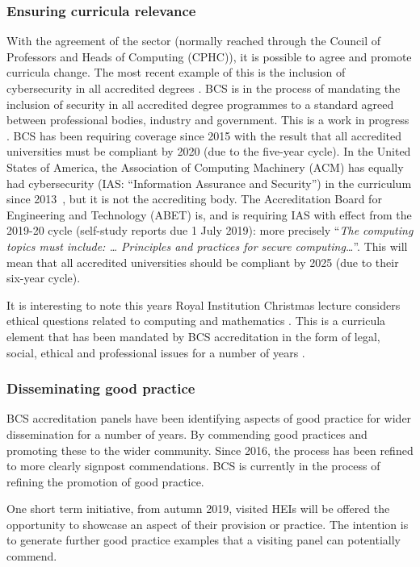 \documentclass[sigconf]{acmart}
\begin{document}
\subsubsection{Ensuring curricula relevance}
With the agreement of the sector (normally reached through the Council of Professors and Heads of Computing (CPHC)), it is possible to agree and promote curricula change. The most recent example of this is the inclusion of cybersecurity in all accredited degrees \cite{Cricketal2019}. BCS is in the process of mandating the inclusion of security in all accredited degree programmes to a standard agreed between professional bodies, industry and government. This is a work in progress \cite{Irons2016}. BCS has been requiring coverage since 2015 \cite[p.~17--18]{BCS2018a} with the result that all accredited universities must be compliant by 2020 (due to the five-year cycle). In the United States of America, the Association of Computing Machinery (ACM) has equally had cybersecurity (IAS: ``Information Assurance and Security'') in the curriculum since 2013~\cite{ACM2013a}, but it is not the accrediting body. The Accreditation Board for Engineering and Technology (ABET) is, and is requiring IAS with effect from the 2019-20 cycle (self-study reports due 1 July 2019): more precisely \cite[Table 3]{Oudshoornetal2018a} ``{\emph{The computing topics must include: \dots{} Principles and practices for secure computing\dots}}''. This will mean that  all accredited universities should be compliant by 2025 (due to their six-year cycle).

It is interesting to note this years Royal Institution Christmas lecture considers ethical questions related to computing and mathematics \cite{RoyalInstitution2019}. This is a curricula element that has been mandated by BCS accreditation in the form of legal, social, ethical and professional issues for a number of years \cite{Brooke2018}.

\subsubsection{Disseminating good practice}
BCS accreditation panels have been identifying aspects of good practice for wider dissemination for a number of years. By commending good practices and promoting these to the wider community. Since 2016, the process has been refined to more clearly signpost commendations. BCS is currently in the process of refining the promotion of good practice.

One short term initiative, from autumn 2019, visited HEIs will be offered the opportunity to showcase an aspect of their provision or practice. The intention is to generate further good practice examples that a visiting panel can potentially commend.
\end{document}
